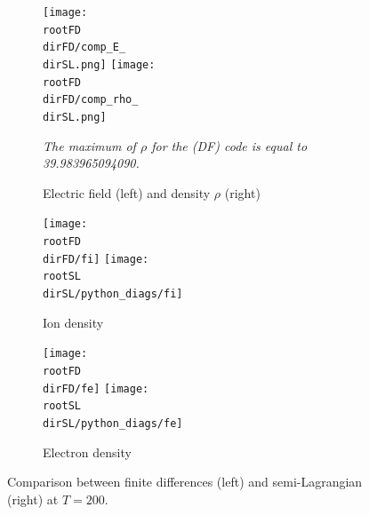 \documentclass{article}
\numberwithin{equation}{section}
\newcommand{\mysubcaption}[1]{
	\vspace*{5pt}
	\begin{minipage}{0.8\linewidth}
		\begin{center}
			\footnotesize\emph{#1}
		\end{center}
	\end{minipage}
}
\newcommand{\imh}{\textwidth} %
\begin{document}
\begin{figure}
	\centering
	\newcommand{\rootSL}{../code_SL/}
	\newcommand{\rootFD}{../temp_res_DF/}
	\newcommand{\dirSL}{run_comp_long_time_2sp_Nx1000_Nvi2001_Nve2001_Nt100000}
	\newcommand{\dirFD}{run_comp_long_time_2sp_Nx200_Nv400_Nt2500000}
	
	\renewcommand{\imh}{0.33\linewidth}
	
	\begin{subfigure}{\textwidth}
		\centering
		\texttt{[image: \\rootFD\\dirFD/comp\_E\_\\dirSL.png]}
		\texttt{[image: \\rootFD\\dirFD/comp\_rho\_\\dirSL.png]}
		\caption{Electric field (left) and density $\rho$ (right)}
		\mysubcaption{The maximum of $\rho$ for the (DF) code is equal to 39.983965094090.}
		\label{subfig:compT200_E_rho}
	\end{subfigure}
	
	\begin{subfigure}{\textwidth}
		\centering
		\texttt{[image: \\rootFD\\dirFD/fi]}
		\texttt{[image: \\rootSL\\dirSL/python\_diags/fi]}
		\caption{Ion density} 
		\label{subfig:compT200_ion}
	\end{subfigure}
	\begin{subfigure}{\textwidth}
		\centering
		\texttt{[image: \\rootFD\\dirFD/fe]}
		\texttt{[image: \\rootSL\\dirSL/python\_diags/fe]}
		\caption{Electron density}
		\label{subfig:compT200_electron}
	\end{subfigure}
	\caption{Comparison between finite differences (left) and semi-Lagrangian (right) at $T=200$.}
	\label{fig:compT200}
\end{figure}  



\end{document}
